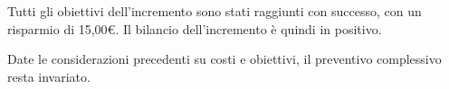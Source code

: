Tutti gli obiettivi dell’incremento sono stati raggiunti con successo, con un risparmio di 15,00\euro. Il bilancio dell’incremento è quindi in positivo.

Date le considerazioni precedenti su costi e obiettivi, il preventivo complessivo resta invariato.


\pagebreak




		
	
		
		
		
